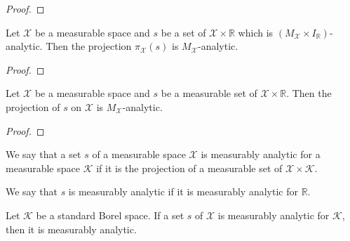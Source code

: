 \begin{proof}  

\end{proof}


\begin{lemma}\label{lem:isPavingAnalytic_fst_of_image2_prod_measurableSet_Icc}
  \leanok
Let $\mathcal{X}$ be a measurable space and $s$ be a set of $\mathcal{X} \times \mathbb{R}$ which is $(M_{\mathcal{X}} \times I_{\mathbb{R}})$-analytic.
Then the projection $\pi_{\mathcal{X}}(s)$ is $M_{\mathcal{X}}$-analytic.
\end{lemma}

\begin{proof}\leanok

\end{proof}


\begin{lemma}\label{lem:MeasurableSet.isPavingAnalytic_fst}
Let $\mathcal{X}$ be a measurable space and $s$ be a measurable set of $\mathcal{X} \times \mathbb{R}$.
Then the projection of $s$ on $\mathcal{X}$ is $M_{\mathcal{X}}$-analytic.
\end{lemma}

\begin{proof}  

\end{proof}


\begin{definition}\label{def:IsMeasurableAnalytic}
We say that a set $s$ of a measurable space $\mathcal{X}$ is measurably analytic for a measurable space $\mathcal{K}$ if it is the projection of a measurable set of $\mathcal{X} \times \mathcal{K}$.

We say that $s$ is measurably analytic if it is measurably analytic for $\mathbb{R}$.
\end{definition}


\begin{lemma}\label{lem:IsMeasurableAnalyticFor.isMeasurableAnalytic}
  \leanok
Let $\mathcal{K}$ be a standard Borel space.
If a set $s$ of $\mathcal{X}$ is measurably analytic for $\mathcal{K}$, then it is measurably analytic.
\end{lemma}

